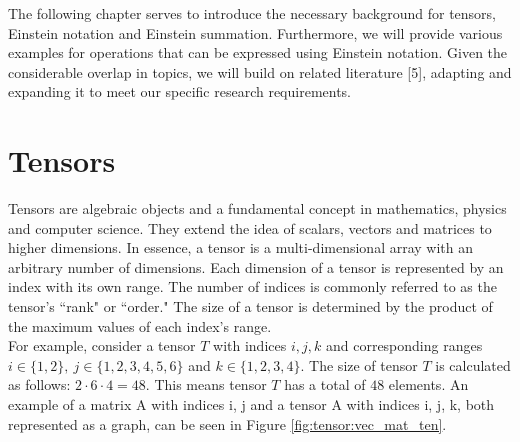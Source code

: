 The following chapter serves to introduce the necessary background for tensors,
Einstein notation and Einstein summation. Furthermore, we will provide various 
examples for operations that can be expressed using Einstein notation. Given the 
considerable overlap in topics, we will build on related literature [5], adapting 
and expanding it to meet our specific research requirements.

\section{Tensors}
Tensors are algebraic objects and a fundamental concept in mathematics, physics
and computer science. They extend the idea of scalars, vectors and matrices to
higher dimensions. In essence, a tensor is a multi-dimensional array with an arbitrary 
number of dimensions. Each dimension of a tensor is represented by an index with its 
own range. The number of indices is commonly referred to as the tensor's ``rank" or 
``order." The size of a tensor is determined by the product of the maximum values of 
each index's range.\\
For example, consider a tensor $T$ with indices $i,j,k$ and corresponding ranges
$i \in \{1,2\},\ j \in \{1,2,3,4,5,6\}$ and $k \in \{1,2,3,4\}$. The size of
tensor $T$ is calculated as follows: $2 \cdot 6 \cdot 4 = 48$. This means tensor
$T$ has a total of $48$ elements. An example of a matrix A with indices i, j and a tensor 
A with indices i, j, k, both represented as a graph, can be seen in Figure 
\ref{fig:tensor:vec_mat_ten}.

